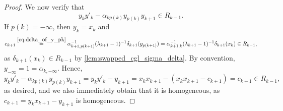 \begin{proof}
	We now verify that
	\begin{equation*}
		y_k y'_k - \alpha_{k p(k)}y_{p(k)}y_{k+1} \in R_{k-1}.
	\end{equation*}
	If $p(k) = -\infty$, then $y_k = x_k$ and
	\begin{equation*}
		c_{k+1} \overset{\eqref{eq:delta_of_y_pk}}{=} \alpha_{k+1, p(k+1)}^{-1} (\lambda_{k+1} - 1)^{-1}\delta_{k+1}(y_{p(k+1)})
		= \alpha_{k+1, k}^{-1} (\lambda_{k+1} -1)^{-1} \delta_{k+1}(x_k) \in R_{k-1},
	\end{equation*}
	as $\delta_{k+1}(x_k) \in R_{k-1}$ by \cref{lem:swapped_cgl_sigma_delta}. By
	convention, $y_{-\infty} = 1 = \alpha_{k, -\infty}$. Hence,
	\begin{equation}\label{eq:y_k_y_k_prime_when_pk_inf}
		y_k y'_k - \alpha_{kp(k)}y_{p(k)}y_{k+1} = y_k y'_k - y_{k+1} =  x_k x_{k+1} - (x_k x_{k+1} - c_{k+1}) = c_{k+1} \in R_{k-1},
	\end{equation}
	as desired, and we also immediately obtain that it is homogeneous, as $c_{k+1} = y_k x_{k+1} -y_{k+1}$ is homogeneous.


\end{proof}
